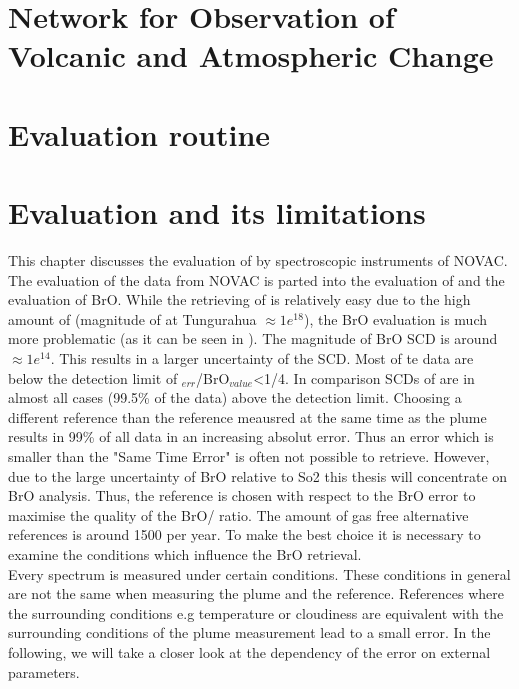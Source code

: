 \documentclass  [
  paper    = a4,
  BCOR     = 10mm,
  twoside,
  fontsize = 12pt,
  fleqn,
  toc      = bibnumbered,
  toc      = listofnumbered,
  numbers  = noendperiod,
  headings = normal,
  listof   = leveldown,
  version  = 3.03
]                                       {scrreprt}
\begin{document}
	
	\chapter{Network for Observation of Volcanic and Atmospheric Change \label{NOVAC}}
	
	
	\chapter{Evaluation routine}
	
	\chapter{  Evaluation and its limitations}
	This chapter discusses the evaluation of   by spectroscopic instruments of NOVAC.\\
	The evaluation of the data from NOVAC is parted into the evaluation of  and the evaluation of BrO. While the retrieving of  is relatively easy due to the high amount of  (magnitude of  at Tungurahua $\approx 1e^{18}$), the BrO evaluation is much more problematic (as it can be seen in ). The magnitude of BrO SCD is around $\approx 1e^{14}$. 
	This results in a larger uncertainty of the   SCD. Most of te   data are below the detection limit of $_{err}$/BrO$_{value}$<1/4. In comparison SCDs of   are in almost all cases (99.5\% of the data) above the detection limit. 
	Choosing a different reference than the reference meausred at the same time as the plume results in 99\% of all data in an increasing absolut error. 
	Thus an  error which is smaller than the "Same Time Error" is often not  possible to retrieve. However, due to the large uncertainty of BrO relative to So2 this thesis will concentrate on BrO analysis. Thus, the reference is chosen with respect to the BrO error to maximise the quality of the BrO/ ratio. The amount of gas free alternative references is around 1500 per year. To make the best choice it is necessary to examine the conditions which influence the BrO retrieval.
	\\
	Every spectrum is measured under certain conditions. These conditions in general are not the same when measuring the plume and the reference.
	References where the surrounding conditions e.g temperature or cloudiness are equivalent with the surrounding conditions of the  plume measurement lead to a small error.
	In the following, we will take a closer look at the dependency of the  error on external parameters. 
\end{document}
